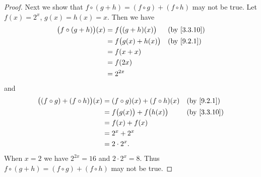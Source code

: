\begin{proof}
  Next we show that \(f \circ (g + h) = (f \circ g) + (f \circ h)\) may not be true.
  Let \(f(x) = 2^x\), \(g(x) = h(x) = x\).
  Then we have
  \begin{align*}
    \big(f \circ (g + h)\big)(x) & = f\big((g + h)(x)\big)  &  & \text{(by \cref{3.3.10})} \\
                                 & = f\big(g(x) + h(x)\big) &  & \by{9.2.1}                \\
                                 & = f(x + x)                                              \\
                                 & = f(2x)                                                 \\
                                 & = 2^{2x}
  \end{align*}
  and
  \begin{align*}
    \big((f \circ g) + (f \circ h)\big)(x) & = (f \circ g)(x) + (f \circ h)(x)   &  & \by{9.2.1}                \\
                                           & = f\big(g(x)\big) + f\big(h(x)\big) &  & \text{(by \cref{3.3.10})} \\
                                           & = f(x) + f(x)                                                      \\
                                           & = 2^x + 2^x                                                        \\
                                           & = 2 \cdot 2^x.
  \end{align*}
  When \(x = 2\) we have \(2^{2x} = 16\) and \(2 \cdot 2^x = 8\).
  Thus \(f \circ (g + h) = (f \circ g) + (f \circ h)\) may not be true.


\end{proof}
